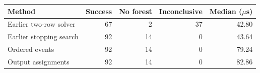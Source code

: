 \begin{center}
\begin{tabular}{@{}lrrrr@{}}
\toprule
Method & Success & No forest & Inconclusive & Median ($\mu$s) \\
\midrule
Earlier two-row solver & 67 & 2 & 37 & 42.80 \\
Earlier stopping search & 92 & 14 & 0 & 43.64 \\
Ordered events & 92 & 14 & 0 & 79.24 \\
Output assignments & 92 & 14 & 0 & 82.86 \\
\bottomrule
\end{tabular}
\end{center}
